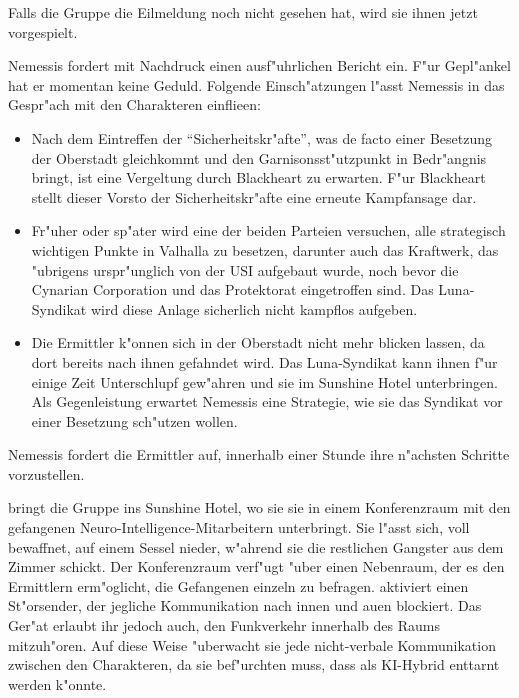 
Falls die Gruppe die Eilmeldung noch nicht gesehen hat, wird sie ihnen jetzt vorgespielt.


Nemessis fordert mit Nachdruck einen ausf"uhrlichen Bericht ein. F"ur Gepl"ankel hat er momentan keine Geduld. Folgende Einsch"atzungen l"asst Nemessis in das Gespr"ach mit den Charakteren einflie\3en:

\begin{itemize}
	\item Nach dem Eintreffen der "`Sicherheitskr"afte"', was de facto einer Besetzung der Oberstadt gleichkommt und den Garnisonsst"utzpunkt 
		in Bedr"angnis bringt, ist eine Vergeltung durch Blackheart zu erwarten. F"ur Blackheart stellt dieser Vorsto\3 der Sicherheitskr"afte eine erneute Kampfansage dar.
	\item Fr"uher oder sp"ater wird eine der beiden Parteien versuchen, alle strategisch wichtigen Punkte in Valhalla zu besetzen, darunter 
		auch das Kraftwerk, das "ubrigens urspr"unglich von der USI aufgebaut wurde, noch bevor die Cynarian Corporation und das Protektorat eingetroffen sind. Das Luna-Syndikat wird diese Anlage sicherlich nicht kampflos aufgeben.
	\item Die Ermittler k"onnen sich in der Oberstadt nicht mehr blicken lassen, da dort bereits nach ihnen gefahndet wird. Das 
		Luna-Syndikat kann ihnen f"ur einige Zeit Unterschlupf gew"ahren und sie im Sunshine Hotel unterbringen. Als Gegenleistung erwartet Nemessis eine Strategie, wie sie das Syndikat vor einer Besetzung sch"utzen wollen.
\end{itemize}

Nemessis fordert die Ermittler auf, innerhalb einer Stunde ihre n"achsten Schritte vorzustellen.


\xl{} bringt die Gruppe ins Sunshine Hotel, wo sie sie in einem Konferenzraum mit den gefangenen Neuro-Intelligence-Mitarbeitern unterbringt. Sie l"asst sich, voll bewaffnet, auf einem Sessel nieder, w"ahrend sie die restlichen Gangster aus dem Zimmer schickt. Der Konferenzraum verf"ugt "uber einen Nebenraum, der es den Ermittlern erm"oglicht, die Gefangenen einzeln zu befragen. \xl{} aktiviert einen St"orsender, der jegliche Kommunikation nach innen und au\3en blockiert. Das Ger"at erlaubt ihr jedoch auch, den Funkverkehr innerhalb des Raums mitzuh"oren. Auf diese Weise "uberwacht sie jede nicht-verbale Kommunikation zwischen den Charakteren, da sie bef"urchten muss, dass \ml{} als KI-Hybrid enttarnt werden k"onnte.

